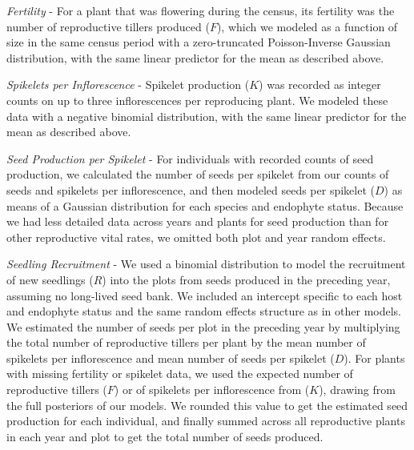\documentclass[lineno, sn-basic]{sn-jnl}%
\begin{document}
\emph{Fertility} - For a plant that was flowering during the census, its fertility was the number of reproductive tillers produced ($F$), which we modeled as a function of size in the same census period with a zero-truncated Poisson-Inverse Gaussian distribution, with the same linear predictor for the mean as described above. 

\emph{Spikelets per Inflorescence} - Spikelet production ($K$) was recorded as integer counts on up to three inflorescences per reproducing plant.
We modeled these data with a negative binomial distribution, with the same linear predictor for the mean as described above. 

\emph{Seed Production per Spikelet} - For individuals with recorded counts of seed production, we calculated the number of seeds per spikelet from our counts of seeds and spikelets per inflorescence, and then modeled seeds per spikelet ($D$) as means of a Gaussian distribution for each species and endophyte status. 
Because we had less detailed data across years and plants for seed production than for other reproductive vital rates, we omitted both plot and year random effects. 

\emph{Seedling Recruitment} - We used a binomial distribution to model the recruitment of new seedlings ($R$) into the plots from seeds produced in the preceding year, assuming no long-lived seed bank. 
We included an intercept specific to each host and endophyte status and the same random effects structure as in other models. 
We estimated the number of seeds per plot in the preceding year by multiplying the total number of reproductive tillers per plant by the mean number of spikelets per inflorescence and mean number of seeds per spikelet ($D$).
For plants with missing fertility or spikelet data, we used the expected number of reproductive tillers ($F$) or of spikelets per inflorescence from ($K$), drawing from the full posteriors of our models. 
We rounded this value to get the estimated seed production for each individual, and finally summed across all reproductive plants in each year and plot to get the total number of seeds produced. 
\end{document}
